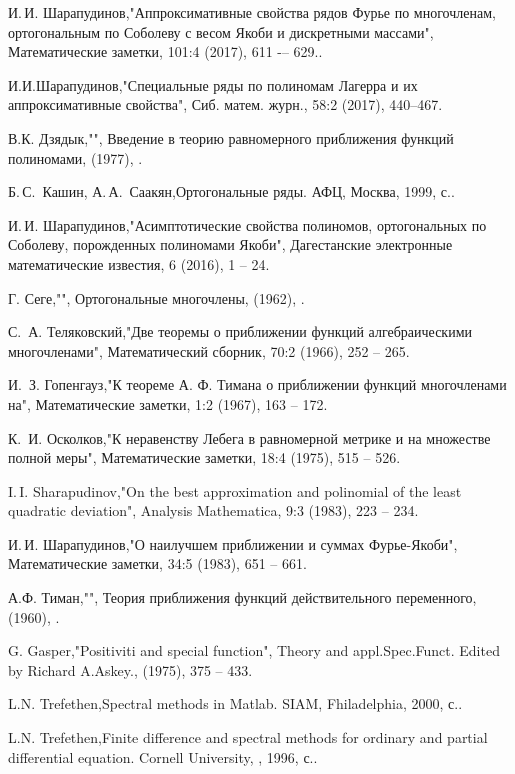 \begin{thebibliography}{20}
И.\,И. Шарапудинов,"Аппроксимативные свойства рядов Фурье по многочленам, ортогональным по Соболеву с весом Якоби и дискретными массами", Математические заметки, 101:4 (2017), 611 -– 629..


И.И.Шарапудинов,"Специальные ряды по полиномам Лагерра и их аппроксимативные свойства", Сиб. матем. журн., 58:2 (2017), 440–467.


В.К. Дзядык,"", Введение в теорию равномерного приближения функций полиномами,  (1977), .


Б.\,С.~Кашин, А.\,А.~Саакян,Ортогональные ряды. АФЦ, Москва, 1999,  с..


И.\,И. Шарапудинов,"Асимптотические свойства полиномов, ортогональных по Соболеву, порожденных полиномами Якоби", Дагестанские электронные математические известия, 6 (2016), 1 -- 24.


Г. Сеге,"", Ортогональные многочлены,  (1962), .


С.\, А. Теляковский,"Две теоремы о приближении функций алгебраическими многочленами", Математический сборник, 70:2 (1966), 252 -- 265.


И.\, З. Гопенгауз,"К теореме А. Ф. Тимана о приближении функций многочленами на", Математические  заметки, 1:2 (1967), 163 -- 172.


К.\, И. Осколков,"К неравенству Лебега в равномерной метрике и на множестве полной меры", Математические  заметки, 18:4 (1975), 515 -- 526.


I.\,I. Sharapudinov,"On the best approximation and polinomial of the least quadratic deviation", Analysis Mathematica, 9:3 (1983), 223 -- 234.


И.\,И. Шарапудинов,"О наилучшем приближении и суммах Фурье-Якоби", Математические заметки, 34:5 (1983), 651 -- 661.


А.Ф. Тиман,"", Теория приближения функций действительного переменного,  (1960), .


G. Gasper,"Positiviti and special function", Theory and appl.Spec.Funct. Edited by Richard A.Askey.,  (1975), 375 -- 433.


L.N. Trefethen,Spectral methods in Matlab. SIAM, Fhiladelphia, 2000,  с..


L.N. Trefethen,Finite difference and spectral methods for ordinary and partial differential equation. Cornell University, , 1996,  с..



\end{thebibliography}
